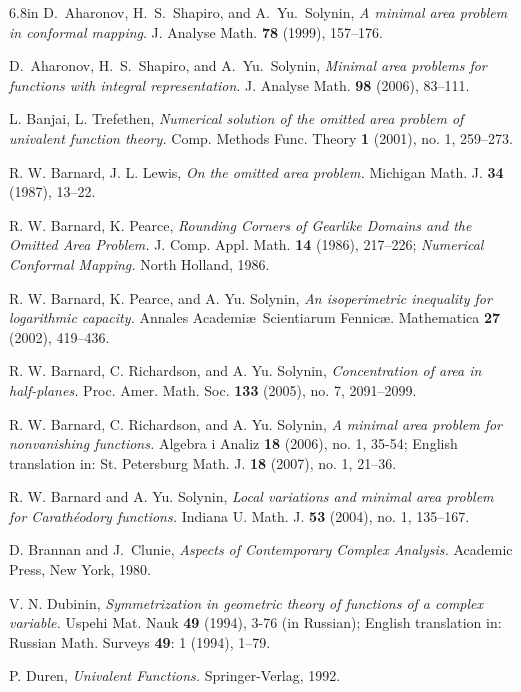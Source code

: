 \documentclass[mn,a4paper,fleqn]{w-art}
\begin{document}
{\begin{thebibliography}{6.8in}
D.~Aharonov, H.~S.~Shapiro, and A.~Yu.~Solynin, 
\textit{A minimal area problem in conformal mapping}. J. Analyse Math.
\textbf{78} (1999), 157--176.

D.~Aharonov, H.~S.~Shapiro, and A.~Yu.~Solynin, 
\textit{Minimal area problems for functions with integral representation}. J. Analyse Math. 
\textbf{98} (2006), 83--111.

 L. Banjai, L. Trefethen,
\textit{Numerical solution of the omitted area problem of univalent function theory.} Comp. Methods Func. Theory
\textbf{1} (2001), no. 1, 259--273.

 R. W. Barnard, J. L. Lewis,
\textit{On the omitted area problem.} Michigan Math. J.
\textbf{34} (1987), 13--22.

 R. W. Barnard, K. Pearce,
\textit{Rounding Corners of Gearlike Domains and the Omitted Area Problem.} J. Comp. Appl. Math.
\textbf{14} (1986), 217--226; 
\textit{Numerical Conformal Mapping.} North Holland, 1986.

 R. W. Barnard, K. Pearce, and A. Yu. Solynin,
\textit{An isoperimetric inequality for logarithmic capacity.} Annales Academi\ae \ Scientiarum Fennic\ae. Mathematica
\textbf{27} (2002), 419--436.

 R. W. Barnard, C. Richardson, and A. Yu. Solynin,
\textit{Concentration of area in half-planes.} Proc. Amer. Math. Soc. 
\textbf{133} (2005), no. 7, 2091--2099.

 R. W. Barnard, C. Richardson, and A. Yu. Solynin,
\textit{A minimal area problem for nonvanishing functions.} Algebra i Analiz 
\textbf{18} (2006), no. 1, 35-54; 
English translation in: St. Petersburg Math. J. 
\textbf{18} (2007), no. 1, 21--36.

 R. W. Barnard and A. Yu. Solynin, 
\textit{Local variations and minimal area problem for Carath\'{e}odory functions.} Indiana U. Math. J. 
\textbf{53} (2004), no. 1, 135--167.

 D. Brannan and J.~Clunie,
\textit{Aspects of Contemporary Complex Analysis.} Academic Press, New York, 1980.

 V. N. Dubinin, 
\textit{Symmetrization in geometric theory of functions of a complex variable.}  Uspehi Mat. Nauk
\textbf{49} (1994), 3-76 (in Russian); 
English translation in: Russian Math. Surveys 
\textbf{49}: 1 (1994), 1--79.

 P. Duren, 
\textit{Univalent Functions.} Springer-Verlag, 1992.


\end{thebibliography}}
\end{document}
